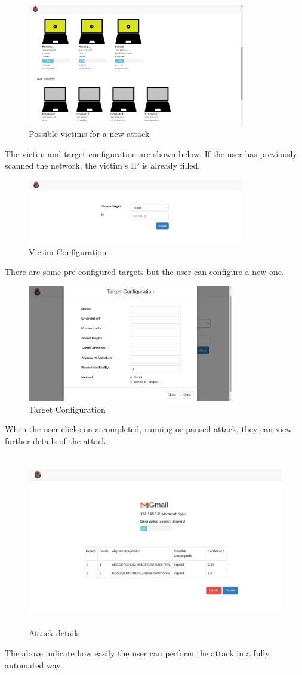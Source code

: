 \begin{figure}[H] \centering \includegraphics[width=95mm]{diagrams/notstarted.png}
\caption{Possible victims for a new attack} \end{figure}

The victim and target configuration are shown below. If the user has previously scanned 
the network, the victim's IP is already filled.

\begin{figure}[H] \caption{Victim Configuration} \centering 
\includegraphics[width=95mm]{diagrams/victim.png} \end{figure}

There are some pre-configured targets but the user can configure a 
new one.


\begin{figure}[H]
    \centering
    \includegraphics[width=90mm]{diagrams/target.png}
    \caption{Target Configuration}
\end{figure}

When the user clicks on a completed, running or paused attack, 
they can view further details of the attack.

\begin{figure}[H]
    \centering
    \includegraphics[width=115mm, height=75mm]{diagrams/attack.png}
    \caption{Attack details}
\end{figure}

The above indicate how easily the user can perform the attack in a fully automated way.
